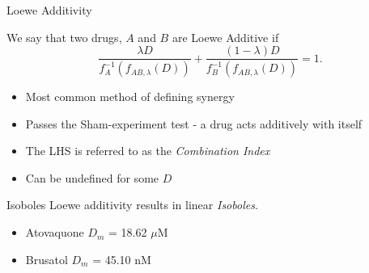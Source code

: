 \documentclass{beamer}
\begin{document}
\begin{frame}{Loewe Additivity}
    \begin{definition}
        We say that two drugs, $A$ and $B$ are \alert{Loewe Additive} if \[
            \frac{\lambda D}{f_A^{-1} (f_{AB, \lambda}(D))} + \frac{(1 - \lambda) D}{f_B^{-1} (f_{AB, \lambda}(D))} = 1.
        \]
    \end{definition}
    \vfill 
    \begin{itemize}
        \item Most common method of defining synergy
        \item Passes the \alert{Sham-experiment test} - a drug acts additively with itself
        \item The LHS is referred to as the \textit{Combination Index}
        \item Can be undefined for some $D$
    \end{itemize}
\end{frame}

\begin{frame}{Isoboles}
    Loewe additivity results in linear \textit{Isoboles}.
    \begin{itemize}
        \item Atovaquone $D_m$ = 18.62 $\mu$M
        \item Brusatol $D_m$ = 45.10 nM
    \end{itemize}
    \begin{center}
    \end{center}

\end{frame}
\end{document}
